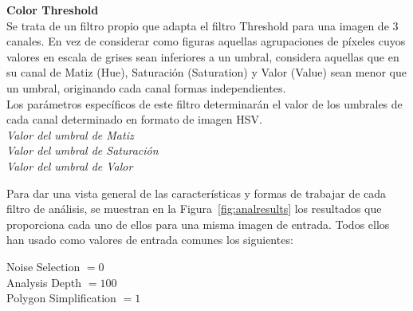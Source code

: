 	\noindent\textbf{Color Threshold}\\

		Se trata de un filtro propio que adapta el filtro Threshold para una imagen de 3 canales. En vez de considerar como figuras aquellas agrupaciones de píxeles cuyos valores en escala de grises sean inferiores a un umbral, considera aquellas que en su canal de Matiz (Hue), Saturación (Saturation) y Valor (Value) sean menor que un umbral, originando cada canal formas independientes.\\
		
		Los parámetros específicos de este filtro determinarán el valor de los umbrales de cada canal determinado en formato de imagen HSV.\\		
		
		\noindent\textit{Valor del umbral de Matiz}\\
		\noindent\textit{Valor del umbral de Saturación}\\
		\noindent\textit{Valor del umbral de Valor}

		
		
		\vspace{0.5in}Para dar una vista general de las características y formas de trabajar de cada filtro de análisis, se muestran en la Figura~\ref{fig:analresults} los resultados que proporciona cada uno de ellos para una misma imagen de entrada. Todos ellos han usado como valores de entrada comunes los siguientes:

		
		\begin{center}
			Noise Selection $= 0$\\
			Analysis Depth $= 100$\\
			Polygon Simplification $= 1$\\
		\end{center}
		
